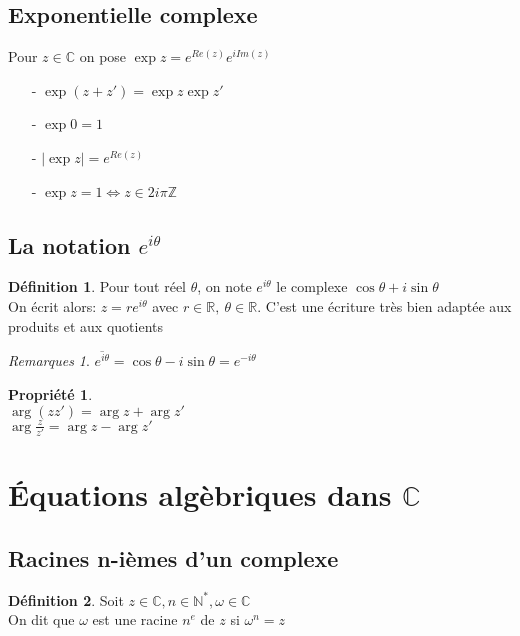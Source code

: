 \documentclass[fleqn]{article}
\theoremstyle{definition} \newtheorem*{defi}{D\'efinition}
\theoremstyle{definition} \newtheorem*{theo}{Th\'eor\`eme}
\theoremstyle{definition} \newtheorem*{coro}{Corollaire}
\theoremstyle{remark} \newtheorem*{rqs}{Remarques}
\theoremstyle{definition} \newtheorem*{prop}{Propri\'et\'e}
\begin{document}
\subsection{Exponentielle complexe}
Pour $z \in \mathbb{C}$ on pose $\exp z = e^{Re(z)} e^{iIm(z)}$
\begin{itemize}
	\item [-] $\exp (z + z') = \exp z \exp z'$
	\item [-] $\exp 0 = 1$
	\item [-] $|\exp z| = e^{Re(z)}$
	\item [-] $\exp z = 1 \Leftrightarrow z \in 2i\pi\mathbb{Z}$
\end{itemize}

\subsection{La notation $e^{i \theta}$}
\begin{defi}
	Pour tout r\'eel $\theta$, on note $e^{i\theta}$ le complexe $\cos \theta + i \sin \theta$\\
	On \'ecrit alors: $z = re^{i\theta}$ avec $r \in \mathbb{R},\ \theta \in \mathbb{R}$. C'est une \'ecriture tr\`es bien adapt\'ee aux produits
	et aux quotients
	\begin{rqs}
		$\overline{e^{i\theta}} = \cos \theta - i \sin \theta = e^{-i\theta}$
	\end{rqs}
\end{defi}
\begin{prop} $ $ \\
	$\arg (zz') = \arg z + \arg z'$\\
	$\arg \frac{z}{z'}  = \arg z  - \arg z'$
\end{prop}

\section{\'Equations alg\`ebriques dans $\mathbb{C}$}

\subsection{Racines n-i\`emes d'un complexe}
\begin{defi} Soit $z \in \mathbb{C}, n \in \mathbb{N}^*, \omega \in \mathbb{C}$ \\
	On dit que $\omega$ est une racine $n^e$ de $z$ si $\omega^n = z$
\end{defi}
\end{document}
